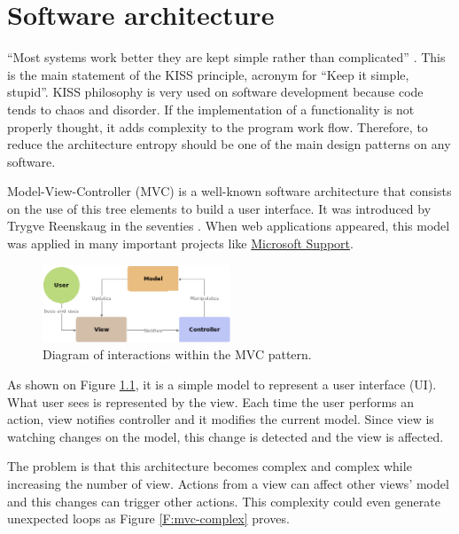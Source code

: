 \chapter{Software architecture}


“Most systems work better they are kept simple rather than complicated”
\cite{kiss-wiki}. This is the main statement of the KISS principle, acronym for
“Keep it simple, stupid”. KISS philosophy is very used on software development
because code tends to chaos and disorder. If the implementation of a
functionality is not properly thought, it adds complexity to the program work
flow. Therefore, to reduce the architecture entropy should be one of the main
design patterns on any software.

Model-View-Controller (MVC) is a well-known software architecture that consists
on the use of this tree elements to build a user interface. It was introduced 
by Trygve Reenskaug in the seventies \cite{mvc-past-present}. When web
applications appeared, this model was applied in many important projects
like \href{https://support.microsoft.com}{Microsoft Support}. 


\begin{figure}[htb]
	\begin{center}
		\includegraphics[width=0.5\textwidth]{./figures/mvc.png}
		\caption{Diagram of interactions within the MVC pattern.
				 \cite{mvc-wiki}}
		\label{F:mvc}
	\end{center}
\end{figure}

As shown on Figure \ref{F:mvc}, it is a simple model to represent a user
interface (UI). What user sees is represented by the view. Each time the user 
performs an action, view notifies controller and it modifies the current model.
Since view is watching changes on the model, this change is detected and the 
view is affected.

The problem is that this architecture becomes complex and complex while 
increasing the number of view. Actions from a view can affect other views'
model and this changes can trigger other actions. This complexity could even
generate unexpected loops as Figure \ref{F:mvc-complex} proves.

